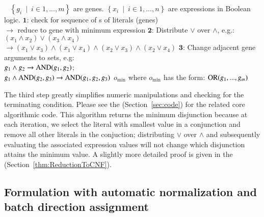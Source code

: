 \begin{AlgFloat}[H]
\begin{Algorithm}
\label{alg:ReductionToCNF}
\begin{algorithmic}
~
\REQUIRE $\left\{g_i~\mid~i \in{1, ..., m}\right\}$ are genes. 
\REQUIRE $\left\{x_i~\mid~i \in{1, ..., n}\right\}$ are expressions in Boolean logic.
  \STATE $\mathbf{1}$: check for sequence of \ANDw s of literals (genes)\\ 
    \hspace{4.8 mm} $\rightarrow$ reduce to gene with minimum expression 
  \STATE $\mathbf{2}$: Distribute $\lor$ over $\land$, e.g.: $(x_1 \land x_2) \lor (x_3 \land x_4)$ \\ 
    \hspace{4.8 mm} $\rightarrow (x_1 \lor x_3) \land (x_1 \lor x_4) \land (x_2 \lor x_3) \land (x_2 \lor x_4)$
  \STATE $\mathbf{3}$: Change adjacent gene arguments to sets, e.g: \\
    \hspace{4.8 mm} $g_1 \land g_2 \rightarrow \textnormal{AND}(g_1,g_2)$;  \\
    \hspace{4.8 mm} $g_1 \land \textnormal{AND}(g_2,g_3) \rightarrow \textnormal{AND}(g_1,g_2,g_3)$ 
\ENDWHILE
\ENSURE $o_{\min}$ where $o_{\min}$ has the form: $\textnormal{OR}(g_1,...,g_m)$
\end{algorithmic} 
\end{Algorithm}
\end{AlgFloat}

The third step greatly simplifies numeric manipulations and checking
for the terminating condition. Please see the
\suppOrApp (Section~\ref{sec:code}) for the related core algorithmic 
code. This algorithm returns the minimum disjunction because at
each iteration, we select the literal with smallest value in a
conjunction and remove all other literals in the conjuction;
distributing $\lor$ over $\land$ and subsequently evaluating the associated
expression values will not change which disjunction attains the
minimum value. A slightly more detailed proof is given in the
\suppOrApp (Section~\ref{thm:ReductionToCNF}).

\subsection{Formulation with automatic normalization and batch direction assignment}

